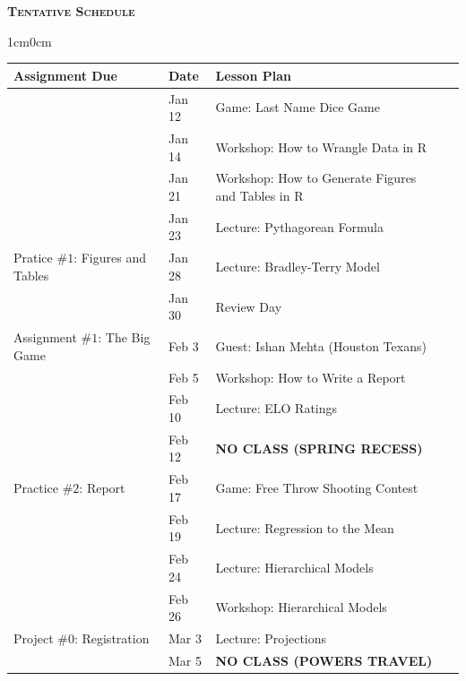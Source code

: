 \documentclass[11pt]{article}
\begin{document}
\newpage
\textbf{\textsc{Tentative Schedule}}\\
\begin{adjustwidth}{1cm}{0cm}
  \begin{center}
    \begin{tabular}{llll}
      Assignment Due                            & Date    & Lesson Plan\\
      \hline
      \hline
                                                & Jan 12  & Game: Last Name Dice Game\\
                                                & Jan 14  & Workshop: How to Wrangle Data in R\\
      \hline
                                                & Jan 21  & Workshop: How to Generate Figures and Tables in R\\
                                                & Jan 23  & Lecture: Pythagorean Formula\\
      \hline
      Pratice \#$1$: Figures and Tables         & Jan 28  & Lecture: Bradley-Terry Model\\
                                                & Jan 30  & Review Day\\
      \hline
      Assignment \#$1$: The Big Game            & Feb  3  & Guest: Ishan Mehta (Houston Texans)\\
                                                & Feb  5  & Workshop: How to Write a Report\\
      \hline
                                                & Feb 10  & Lecture: ELO Ratings\\
                                                & Feb 12  & {\bf NO CLASS (SPRING RECESS)}\\
      \hline
      \hline
      Practice \#$2$: Report                    & Feb 17  & Game: Free Throw Shooting Contest\\
                                                & Feb 19  & Lecture: Regression to the Mean\\
      \hline
                                                & Feb 24  & Lecture: Hierarchical Models\\
                                                & Feb 26  & Workshop: Hierarchical Models\\
      \hline
      Project \#$0$: Registration               & Mar  3  & Lecture: Projections\\
                                                & Mar  5  & {\bf NO CLASS (POWERS TRAVEL)}\\

\end{tabular}
\end{center}
\end{adjustwidth}
\end{document}
